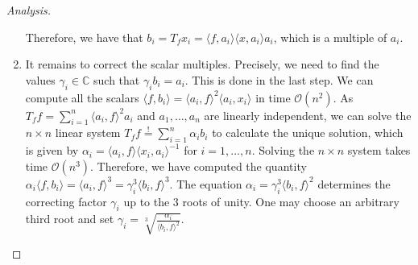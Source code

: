 \begin{proof}[Analysis]
\begin{enumerate}
		Therefore, we have that $ b_i = T_fx_i = \langle f, a_i \rangle \langle x, a_i \rangle a_i$, which is a multiple of $ a_i $. 
		\item It remains to correct the scalar multiples. Precisely, we need to find the values $ \gamma_i \in \mathbb{C}$ such that $ \gamma_i b_i = a_i $. This is done in the last step. We can compute all the scalars $ \langle f, b_i \rangle = \langle a_i, f \rangle^2 \langle a_i, x_i \rangle $ in time $ \mathcal{O}(n^2) $. 
		As $ T_f f  = \sum_{i = 1}^{n} \langle a_i, f \rangle^2 a_i $ and $ a_1,\ldots,a_n $ are linearly independent, we can solve the $ n\times n $ linear system $ T_f f \stackrel{!}{=} \sum_{i = 1}^{n} \alpha_i b_i $ to calculate the unique solution, which is given by $ \alpha_i = \langle a_i, f \rangle \langle x_i, a_i \rangle^{-1}  $ for $ i = 1,\ldots,n $.  Solving the $ n\times n $ system takes time $ \mathcal{O}(n^3) $.  Therefore, we have computed the quantity $ \alpha_i\langle f, b_i \rangle = \langle a_i, f \rangle^3 = \gamma_i^3 \langle b_i, f \rangle^3$. The equation $ \alpha_i = \gamma_i^3 \langle b_i, f \rangle^2 $ determines the correcting factor $ \gamma_i $ up to the $ 3 $ roots of unity. One may choose an arbitrary third root and set $ \gamma_i =  \sqrt[3]{\frac{\alpha_i}{\langle b_i, f \rangle^2}} $. 
	\end{enumerate}
\end{proof}


%
%
%

